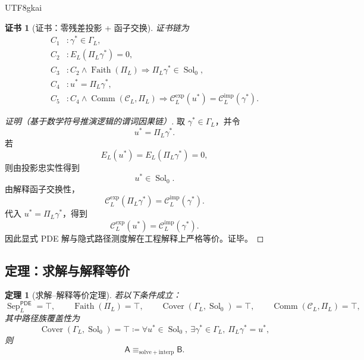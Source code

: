\documentclass[12pt]{article}
\newtheorem{theorem}{定理}[section]
\newtheorem{Certificate}{证书}[section]
\newcommand{\DefEq}{\coloneqq}
\newcommand{\PDE}{\ensuremath{\mathsf{PDE}}}
\DeclareMathOperator{\Sol}{Sol}
\DeclareMathOperator{\Sep}{Sep}
\DeclareMathOperator{\Faith}{Faith}
\DeclareMathOperator{\Cover}{Cover}
\DeclareMathOperator{\Comm}{Comm}
\begin{document}
\begin{CJK*}{UTF8}{gkai}
\begin{Certificate}[证书：零残差投影 + 函子交换]
\label{cert:tex58-projection-interpretation-commutation}
证书链为
\[
\begin{aligned}
  C_1 &: \gamma^\ast\in\Gamma_L,\\
  C_2 &: E_L(\Pi_L\gamma^\ast)=0,\\
  C_3 &: C_2\wedge\Faith(\Pi_L)
  \Rightarrow \Pi_L\gamma^\ast\in\Sol_0,\\
  C_4 &: u^\ast=\Pi_L\gamma^\ast,\\
  C_5 &: C_4\wedge\Comm(\mathcal C_L,\Pi_L)
  \Rightarrow
  \mathcal C_L^{\mathrm{exp}}(u^\ast)
  =
  \mathcal C_L^{\mathrm{imp}}(\gamma^\ast).
\end{aligned}
\]
\end{Certificate}

\begin{proof}[证明（基于数学符号推演逻辑的谓词因果链）]
取 \(\gamma^\ast\in\Gamma_L\)，并令
\[
  u^\ast=\Pi_L\gamma^\ast.
\]
若
\[
  E_L(u^\ast)=E_L(\Pi_L\gamma^\ast)=0,
\]
则由投影忠实性得到
\[
  u^\ast\in\Sol_0.
\]
由解释函子交换性，
\[
  \mathcal C_L^{\mathrm{exp}}(\Pi_L\gamma^\ast)
  =
  \mathcal C_L^{\mathrm{imp}}(\gamma^\ast).
\]
代入 \(u^\ast=\Pi_L\gamma^\ast\)，得到
\[
  \mathcal C_L^{\mathrm{exp}}(u^\ast)
  =
  \mathcal C_L^{\mathrm{imp}}(\gamma^\ast).
\]
因此显式 PDE 解与隐式路径测度解在工程解释上严格等价。证毕。
\end{proof}

\subsection{定理：求解与解释等价}
\label{subsec:tex58-solve-interpretation-equivalence}

\begin{theorem}[求解--解释等价定理]
\label{thm:tex58-solve-interpretation-equivalence}
若以下条件成立：
\[
  \Sep_L^{\PDE}=\top,
  \qquad
  \Faith(\Pi_L)=\top,
  \qquad
  \Cover(\Gamma_L,\Sol_0)=\top,
  \qquad
  \Comm(\mathcal C_L,\Pi_L)=\top,
\]
其中路径族覆盖性为
\[
  \Cover(\Gamma_L,\Sol_0)=\top
  \DefEq
  \forall u^\ast\in\Sol_0,\ \exists\gamma^\ast\in\Gamma_L,\
  \Pi_L\gamma^\ast=u^\ast,
\]
则
\[
  \mathsf A
  \equiv_{\mathrm{solve+interp}}
  \mathsf B.
\]
\end{theorem}


\end{CJK*}
\end{document}
